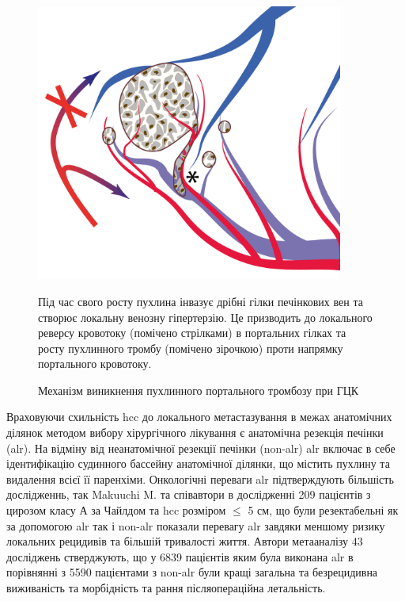 \begin{figure}[h]
\caption{Механізм виникнення пухлинного портального тромбозу при ГЦК}
\includegraphics[width=0.9\textwidth]{Illustrations/Chapter_01/HCC_vascular_invasion.png}
\label{fig:HCC_vascular_invasion}

\medskip
\small
Під час свого росту пухлина інвазує дрібні гілки печінкових вен та створює локальну венозну гіпертерзію. Це призводить до локального реверсу кровотоку (помічено стрілками) в портальних гілках та росту пухлинного тромбу (помічено зірочкою) проти напрямку портального кровотоку.

\end{figure}




Враховуючи схильність \acrshort{hcc} до локального метастазування в межах анатомічних ділянок методом вибору хірургічного лікування є анатомічна резекція печінки (\acrshort{alr}). На відміну від неанатомічної резекції печінки (\acrshort{non-alr}) \acrshort{alr} включає в себе ідентифікацію судинного бассейну анатомічної ділянки, що містить пухлину та видалення всієї її паренхіми. Онкологічні переваги \acrshort{alr} підтверждують більшість дослідженнь, так Makuuchi M. та співавтори \cite{Shindoh2016} в дослідженні 209 пацієнтів з цирозом класу А за Чайлдом та \acrshort{hcc} розміром $\leq$ 5 см, що були резектабельні як за допомогою \acrshort{alr} так і \acrshort{non-alr} показали перевагу \acrshort{alr} завдяки меншому ризику локальних рецидивів та більшій тривалості життя. Автори метааналізу \cite{Moris2018} 43 досліджень стверджують, що у 6839 пацієнтів яким була виконана \acrshort{alr} в порівнянні з 5590 пацієнтами з \acrshort{non-alr} були кращі загальна та безрецидивна виживаність та морбідність та рання післяопераційна летальність.

